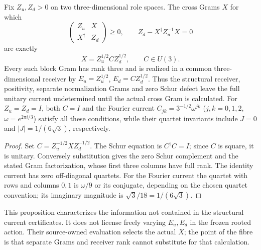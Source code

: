 \documentclass[12pt,a4paper]{article}
\begin{document}
\begin{proposition}
\label{p6:prop:v246-current-gram-orientation-fibre}
Fix $Z_u,Z_d>0$ on two three-dimensional role spaces. The cross Grams
$X$ for which
\[
 \begin{pmatrix}Z_u&X\\X^\dagger&Z_d\end{pmatrix}\ge0,
 \qquad Z_d-X^\dagger Z_u^{-1}X=0
\]
are exactly
\[
 \boxed{X=Z_u^{1/2}CZ_d^{1/2},\qquad C\in U(3).}
\]
Every such block Gram has rank three and is realized in a common
three-dimensional receiver by
$E_u=Z_u^{1/2}$, $E_d=CZ_d^{1/2}$. Thus the structural receiver,
positivity, separate normalization Grams and zero Schur defect leave
the full unitary current undetermined until the actual cross Gram is
calculated. For $Z_u=Z_d=I$, both $C=I$ and the Fourier current
$C_{jk}=3^{-1/2}\omega^{jk}$ ($j,k=0,1,2$, $\omega=e^{2\pi i/3}$)
satisfy all these conditions, while their quartet invariants include
$J=0$ and $|J|=1/(6\sqrt3)$, respectively.
\end{proposition}
\begin{proof}
Set $C=Z_u^{-1/2}XZ_d^{-1/2}$. The Schur equation is
$C^\dagger C=I$; since $C$ is square, it is unitary. Conversely
substitution gives the zero Schur complement and the stated Gram
factorization, whose first three columns have full rank. The identity
current has zero off-diagonal quartets. For the Fourier current the
quartet with rows and columns $0,1$ is $\omega/9$ or its conjugate,
depending on the chosen quartet convention; its imaginary magnitude is
$\sqrt3/18=1/(6\sqrt3)$.
\end{proof}
\begin{remark}
This proposition characterizes the information not contained in the
structural current certificates. It does not license freely varying
$E_u,E_d$ in the frozen rooted action. Their source-owned evaluation
selects the actual $X$; the point of the fibre is that separate Grams
and receiver rank cannot substitute for that calculation.
\end{remark}
\end{document}
